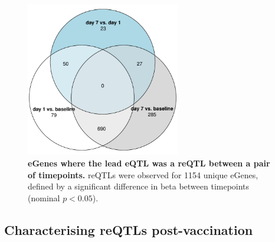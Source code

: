 \begin{figure}
    \centering
    \includegraphics[width=0.6\textwidth]{mainmatter/figures/chapter_03/compare_dge_eqtl.pairwise_reQTL_venn.pdf}
    \caption[
    ]{
        \textbf{eGenes where the lead \gls{eQTL} was a \gls{reQTL} between a pair of timepoints.}
        \glspl{reQTL} were observed for 1154 unique eGenes, 
        defined by a significant difference in beta between timepoints (nominal $p < 0.05$).
    }
    \label{fig:hird_reQTL_pairwise_venn}
\end{figure}

\subsection{Characterising reQTLs post-vaccination}

